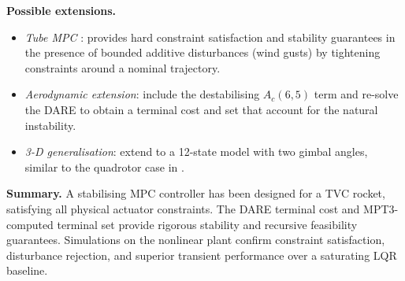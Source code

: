 \documentclass[11pt,a4paper]{article}
\begin{document}
\textbf{Possible extensions.}
\begin{itemize}[noitemsep]
  \item \emph{Tube MPC} \cite{Mayne2011}: provides hard constraint satisfaction and
        stability guarantees in the presence of bounded additive disturbances
        (wind gusts) by tightening constraints around a nominal trajectory.
  \item \emph{Aerodynamic extension}: include the destabilising $A_c(6,5)$ term
        and re-solve the DARE to obtain a terminal cost and set that account for
        the natural instability.
  \item \emph{3-D generalisation}: extend to a 12-state model with two gimbal
        angles, similar to the quadrotor case in \cite{RawlingsMayne2017}.
\end{itemize}

\textbf{Summary.}
A stabilising MPC controller has been designed for a TVC rocket, satisfying all
physical actuator constraints.  The DARE terminal cost and MPT3-computed terminal
set provide rigorous stability and recursive feasibility guarantees.  Simulations
on the nonlinear plant confirm constraint satisfaction, disturbance rejection,
and superior transient performance over a saturating LQR baseline.



\end{document}

